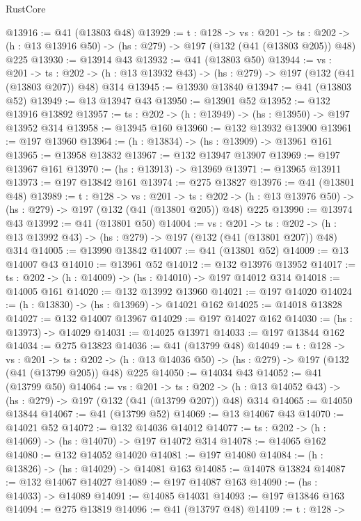 \begin{lexlean}{RustCore}
\begin{coremodule}
@13916 := @41 (@13803 @48)
@13929 := {t : @128} ->
  {vs : @201} ->
  {ts : @202} -> (h : @13 @13916 @50) -> (hs : @279) -> @197 (@132 (@41 (@13803 @205)) @48) @225
@13930 := @13914 @43
@13932 := @41 (@13803 @50)
@13944 := {vs : @201} ->
  {ts : @202} -> (h : @13 @13932 @43) -> (hs : @279) -> @197 (@132 (@41 (@13803 @207)) @48) @314
@13945 := @13930 @13840
@13947 := @41 (@13803 @52)
@13949 := @13 @13947 @43
@13950 := @13901 @52
@13952 := @132 @13916 @13892
@13957 := {ts : @202} -> (h : @13949) -> (hs : @13950) -> @197 @13952 @314
@13958 := @13945 @160
@13960 := @132 @13932 @13900
@13961 := @197 @13960
@13964 := (h : @13834) -> (hs : @13909) -> @13961 @161
@13965 := @13958 @13832
@13967 := @132 @13947 @13907
@13969 := @197 @13967 @161
@13970 := (hs : @13913) -> @13969
@13971 := @13965 @13911
@13973 := @197 @13842 @161
@13974 := @275 @13827
@13976 := @41 (@13801 @48)
@13989 := {t : @128} ->
  {vs : @201} ->
  {ts : @202} -> (h : @13 @13976 @50) -> (hs : @279) -> @197 (@132 (@41 (@13801 @205)) @48) @225
@13990 := @13974 @43
@13992 := @41 (@13801 @50)
@14004 := {vs : @201} ->
  {ts : @202} -> (h : @13 @13992 @43) -> (hs : @279) -> @197 (@132 (@41 (@13801 @207)) @48) @314
@14005 := @13990 @13842
@14007 := @41 (@13801 @52)
@14009 := @13 @14007 @43
@14010 := @13961 @52
@14012 := @132 @13976 @13952
@14017 := {ts : @202} -> (h : @14009) -> (hs : @14010) -> @197 @14012 @314
@14018 := @14005 @161
@14020 := @132 @13992 @13960
@14021 := @197 @14020
@14024 := (h : @13830) -> (hs : @13969) -> @14021 @162
@14025 := @14018 @13828
@14027 := @132 @14007 @13967
@14029 := @197 @14027 @162
@14030 := (hs : @13973) -> @14029
@14031 := @14025 @13971
@14033 := @197 @13844 @162
@14034 := @275 @13823
@14036 := @41 (@13799 @48)
@14049 := {t : @128} ->
  {vs : @201} ->
  {ts : @202} -> (h : @13 @14036 @50) -> (hs : @279) -> @197 (@132 (@41 (@13799 @205)) @48) @225
@14050 := @14034 @43
@14052 := @41 (@13799 @50)
@14064 := {vs : @201} ->
  {ts : @202} -> (h : @13 @14052 @43) -> (hs : @279) -> @197 (@132 (@41 (@13799 @207)) @48) @314
@14065 := @14050 @13844
@14067 := @41 (@13799 @52)
@14069 := @13 @14067 @43
@14070 := @14021 @52
@14072 := @132 @14036 @14012
@14077 := {ts : @202} -> (h : @14069) -> (hs : @14070) -> @197 @14072 @314
@14078 := @14065 @162
@14080 := @132 @14052 @14020
@14081 := @197 @14080
@14084 := (h : @13826) -> (hs : @14029) -> @14081 @163
@14085 := @14078 @13824
@14087 := @132 @14067 @14027
@14089 := @197 @14087 @163
@14090 := (hs : @14033) -> @14089
@14091 := @14085 @14031
@14093 := @197 @13846 @163
@14094 := @275 @13819
@14096 := @41 (@13797 @48)
@14109 := {t : @128} ->

\end{coremodule}
\end{lexlean}
